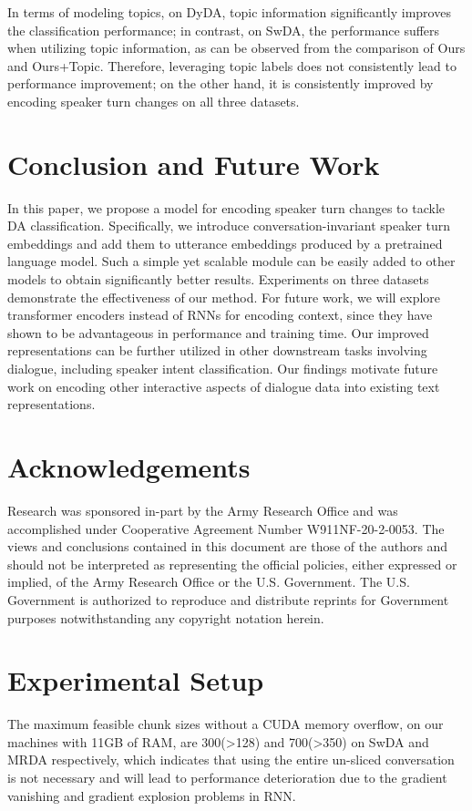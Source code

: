 \documentclass[11pt]{article}
\begin{document}
In terms of modeling topics, on DyDA, topic information significantly improves the classification performance; in contrast, on SwDA, the performance suffers when utilizing topic information, as can be observed from the comparison of Ours and Ours+Topic.
Therefore, leveraging topic labels does not consistently lead to performance improvement; on the other hand, it is consistently improved by encoding speaker turn changes on all three datasets.




\section{Conclusion and Future Work}
In this paper, we propose a model for encoding speaker turn changes to tackle DA classification. Specifically, we introduce conversation-invariant speaker turn embeddings and add them to utterance embeddings produced by a pretrained language model. Such a simple yet scalable module can be easily added to other models to obtain significantly better results. Experiments on three datasets demonstrate the effectiveness of our method. For future work, we will explore transformer encoders \cite{vaswani2017attention} instead of RNNs for encoding context, since they have shown to be advantageous in performance and training time. 
Our improved representations can be further utilized in other downstream tasks involving dialogue, including speaker intent classification. Our findings motivate future work on encoding other interactive aspects of dialogue data into existing text representations. 
\section*{Acknowledgements}
Research was sponsored in-part by the Army Research Office and was accomplished under Cooperative Agreement Number W911NF-20-2-0053. The views and conclusions contained in this document are those of the authors and should not be interpreted as representing the official policies, either expressed or implied, of the Army Research Office or the U.S. Government. The U.S. Government is authorized to reproduce and distribute reprints for Government purposes notwithstanding any copyright notation herein.





\clearpage
\appendix



\section{Experimental Setup}
The maximum feasible chunk sizes without a CUDA memory overflow, on our machines with 11GB of RAM, are 300(>128) and 700(>350) on SwDA and MRDA respectively, which indicates that using the entire un-sliced conversation is not necessary and will lead to performance deterioration due to the gradient vanishing and gradient explosion problems in RNN. 
\end{document}
